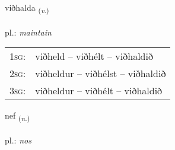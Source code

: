 \documentclass[frontgrid, backgrid]{flacards}\usepackage[]{graphicx}\usepackage[]{xcolor}
\begin{document}
\renewcommand{\blhead}{\vskip5pt {\small\bfseries\footnotesize Sagnorð | Verb }}
\renewcommand{\bcfoot}{\vskip5pt \hspace{2pt}{\small\bfseries\footnotesize 2K}}


{viðhalda \small{\textsubscript{(\textit{v.})}} \\[1ex] %
\textphonetic{[vɪθhalta]} \\
pl.: \emph{maintain} \\  [2ex]
\renewcommand*{\arraystretch}{0.8}
\begin{tabular}{p{1cm}l}
\textsc{1sg}: & viðheld -- viðhélt -- viðhaldið \\ 
\textsc{2sg}: & viðheldur -- viðhélst -- viðhaldið \\ 
\textsc{3sg}: & viðheldur -- viðhélt -- viðhaldið \\ 
\end{tabular}
}

\renewcommand{\flhead}{\vskip5pt \fboxsep=0pt {\small\bfseries\footnotesize Nafnorð | Noun}}
\renewcommand{\fcfoot}{\vskip5pt \fboxsep=0pt \hspace{2pt}{\small\bfseries\footnotesize 2K}}

\renewcommand{\blhead}{\vskip5pt {\small\bfseries\footnotesize Nafnorð | Noun }}
\renewcommand{\bcfoot}{\vskip5pt \hspace{2pt}{\small\bfseries\footnotesize 2K}}


{nef \small{\textsubscript{(\textit{n.})}} \\[1ex] %
\textphonetic{[nɛːv]} \\
pl.: \emph{nos} \\  [2ex]
\renewcommand*{\arraystretch}{0.8}
}

\renewcommand{\flhead}{\vskip5pt \fboxsep=0pt {\small\bfseries\footnotesize Nafnorð | Noun}}
\renewcommand{\fcfoot}{\vskip5pt \fboxsep=0pt \hspace{2pt}{\small\bfseries\footnotesize 2K}}
\end{document}
